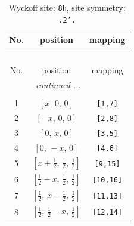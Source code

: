 \documentclass[fleqn,8pt]{jsarticle}
\begin{document}
\begin{longtable}{ccc}
\caption{Wyckoff site: {\tt 8h}, site symmetry: {\tt .2'.}}
 \\
 \hline \hline
No. & position & mapping \\ \hline \endfirsthead

\multicolumn{2}{l}{\tablename\ \thetable{}} \\
 \hline \hline
No. & position & mapping \\ \hline \endhead

 \hline \hline
\multicolumn{2}{r}{\footnotesize\it continued ...} \\ \endfoot

 \hline \hline
\multicolumn{2}{r}{} \\ \endlastfoot

1 & $\left[ x,\, 0,\, 0 \right]$ & {\tt [1,7]} \\ \hline
2 & $\left[ - x,\, 0,\, 0 \right]$ & {\tt [2,8]} \\ \hline
3 & $\left[ 0,\, x,\, 0 \right]$ & {\tt [3,5]} \\ \hline
4 & $\left[ 0,\, - x,\, 0 \right]$ & {\tt [4,6]} \\ \hline
5 & $\left[ x + \frac{1}{2},\, \frac{1}{2},\, \frac{1}{2} \right]$ & {\tt [9,15]} \\ \hline
6 & $\left[ \frac{1}{2} - x,\, \frac{1}{2},\, \frac{1}{2} \right]$ & {\tt [10,16]} \\ \hline
7 & $\left[ \frac{1}{2},\, x + \frac{1}{2},\, \frac{1}{2} \right]$ & {\tt [11,13]} \\ \hline
8 & $\left[ \frac{1}{2},\, \frac{1}{2} - x,\, \frac{1}{2} \right]$ & {\tt [12,14]} \\
\end{longtable}
\renewcommand{\arraystretch}{1.2}
\end{document}
